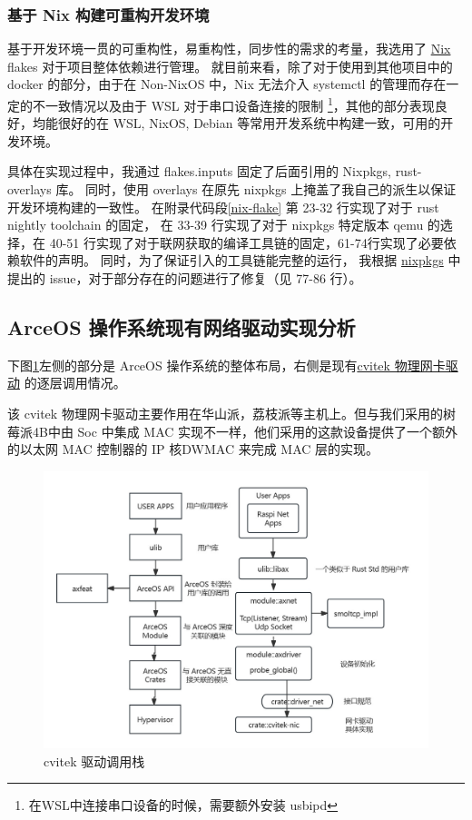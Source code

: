     \subsubsection{基于 Nix 构建可重构开发环境}

    基于开发环境一贯的可重构性，易重构性，同步性的需求的考量，我选用了 \href{https://nixos.org/}{Nix} flakes 对于项目整体依赖进行管理。
    就目前来看，除了对于使用到其他项目中的 docker 的部分，由于在 Non-NixOS 中，Nix 无法介入 systemctl 的管理而存在一定的不一致情况以及由于 WSL 对于串口设备连接的限制
    \footnote{在WSL中连接串口设备的时候，需要额外安装 usbipd}，其他的部分表现良好，均能很好的在 WSL, NixOS, Debian 等常用开发系统中构建一致，可用的开发环境。

    具体在实现过程中，我通过 flakes.inputs 固定了后面引用的 Nixpkgs, rust-overlays 库。
    同时，使用 overlays 在原先 nixpkgs 上掩盖了我自己的派生以保证开发环境构建的一致性。
    在附录代码段\ref{nix-flake} 第 23-32 行实现了对于 rust nightly toolchain 的固定，
    在 33-39 行实现了对于 nixpkgs 特定版本 qemu 的选择，在 40-51 行实现了对于联网获取的编译工具链的固定，61-74行实现了必要依赖软件的声明。
    同时，为了保证引入的工具链能完整的运行，
    我根据 \href{https://github.com/nixos/nixpkgs}{nixpkgs} 中提出的 issue，对于部分存在的问题进行了修复（见 77-86 行）。

\subsection{ArceOS 操作系统现有网络驱动实现分析}

    下图\ref{fig::cvitek}左侧的部分是 ArceOS 操作系统的整体布局，右侧是现有\href{https://github.com/yuoo655/arceos_net/tree/hsp}{cvitek 物理网卡驱动} 的逐层调用情况。

    该 cvitek 物理网卡驱动主要作用在华山派，荔枝派等主机上。但与我们采用的树莓派4B中由 Soc 中集成 MAC 实现不一样，他们采用的这款设备提供了一个额外的以太网 MAC 控制器的 IP 核DWMAC 来完成 MAC 层的实现。

        
    \begin{figure}[ht]
        \centering
        \caption{cvitek 驱动调用栈}    \label{fig::cvitek}
        \includegraphics[scale=0.4]{imgs/cvitek.jpg}
    \end{figure}

